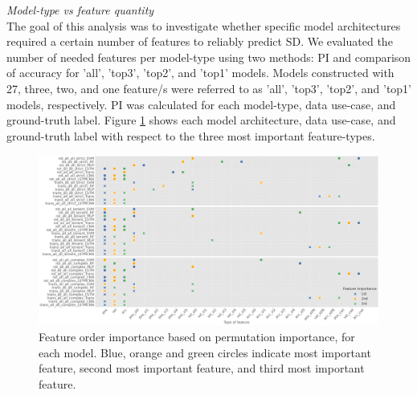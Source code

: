 \documentclass{ieeeaccess}
\begin{document}
\noindent \emph{Model-type vs feature quantity}\\
The goal of this analysis was to investigate whether specific model architectures required a certain number of features to reliably predict SD. We evaluated the number of needed features per model-type using two methods: PI and comparison of accuracy for 'all', 'top3', 'top2', and 'top1' models. Models constructed with 27, three, two, and one feature/s were referred to as 'all', 'top3', 'top2', and 'top1' models, respectively. PI was calculated for each model-type, data use-case, and ground-truth label. Figure \ref{fig7} shows each model architecture, data use-case, and ground-truth label with respect to the three most important feature-types.
\begin{figure}[htp]
\begin{center}
\includegraphics[width=1.0\linewidth]{figures/figure7_2.eps}
\end{center}
\caption{Feature order importance based on permutation importance, for each model. Blue, orange and green circles indicate most important feature, second most important feature, and third most important feature.}
\label{fig7}
\end{figure}
\end{document}
